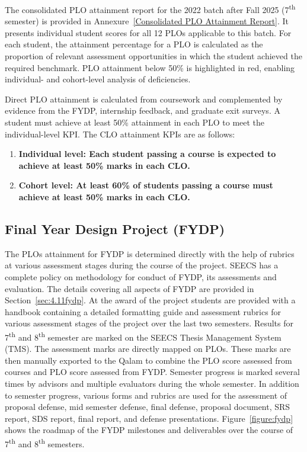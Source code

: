 The consolidated PLO attainment report for the 2022 batch after Fall 2025 (7\textsuperscript{th} semester) is provided in Annexure~\ref{Consolidated PLO Attainment Report}. It presents individual student scores for all 12 PLOs applicable to this batch. For each student, the attainment percentage for a PLO is calculated as the proportion of relevant assessment opportunities in which the student achieved the required benchmark. PLO attainment below 50\% is highlighted in red, enabling individual- and cohort-level analysis of deficiencies.

Direct PLO attainment is calculated from coursework and complemented by evidence from the FYDP, internship feedback, and graduate exit surveys. A student must achieve at least 50\% attainment in each PLO to meet the individual-level KPI. The CLO attainment KPIs are as follows:

\begin{enumerate}[label=\alph*.]
\item \textbf{Individual level: Each student passing a course is expected to achieve at least 50\% marks in each CLO.}
\item \textbf{Cohort level: At least 60\% of students passing a course must achieve at least 50\% marks in each CLO.}
\end{enumerate}

\subsection{Final Year Design Project (FYDP)\label{sec:FYDP}}

The PLOs attainment for FYDP is determined directly with the help of rubrics at various assessment stages during the course of the project. SEECS has a complete policy on methodology for conduct of FYDP, its assessments and evaluation. The details covering all aspects of FYDP are provided in Section~\ref{sec:4.11fydp}. At the award of the project students are provided with a handbook containing a detailed formatting guide and assessment rubrics for various assessment stages of the project over the last two semesters. Results for 7\textsuperscript{th} and 8\textsuperscript{th} semester are marked on the SEECS Thesis Management System (TMS). The assessment marks are directly mapped on PLOs. These marks are then manually exported to the Qalam to combine the PLO score assessed from courses and PLO score assessed from FYDP. Semester progress is marked several times by advisors and multiple evaluators during the whole semester. In addition to semester progress, various forms and rubrics are used for the assessment of proposal defense, mid semester defense, final defense, proposal document, SRS report, SDS report, final report, and defense presentations. Figure~\ref{figure:fydp} shows the roadmap of the FYDP milestones and deliverables over the course of 7\textsuperscript{th} and 8\textsuperscript{th} semesters.

